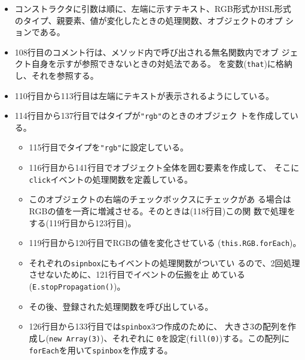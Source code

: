 \begin{itemize}
 \item コンストラクタに引数は順に、左端に示すテキスト、RGB形式かHSL形式
			 のタイプ、親要素、値が変化したときの処理関数、オブジェクトのオプ
			 ションである。
 \item 108行目のコメント行は、メソッド内で呼び出される無名関数内でオブ
			 ジェクト自身を示すが参照できないときの対処法である。
			 を変数(\texttt{that})に格納し、それを参照する。
 \item 110行目から113行目は左端にテキストが表示されるようにしている。
 \item 114行目から137行目ではタイプが\texttt{"rgb"}のときのオブジェク
			 トを作成している。
			 \begin{itemize}
				\item 115行目でタイプを\texttt{"rgb"}に設定している。
				\item 116行目から141行目でオブジェクト全体を囲む要素を作成して、
							そこに\texttt{click}イベントの処理関数を定義している。
				\item このオブジェクトの右端のチェックボックスにチェックがあ
							る場合はRGBの値を一斉に増減させる。そのときは(118行目)この関
							数で処理をする(119行目から123行目)。
				\item 119行目から120行目でRGBの値を変化させている
							(\texttt{this.RGB.forEach})。
				\item それぞれの\texttt{sipnbox}にもイベントの処理関数がついてい
							るので、2回処理させないために、121行目でイベントの伝搬を止
							めている(\texttt{E.stopPropagation()})。
				\item その後、登録された処理関数を呼び出している。
			  \item 126行目から133行目では\texttt{spinbox}3つ作成のために、
							大きさ3の配列を作成し(\texttt{new Array(3)})、それぞれに
							\texttt{0}を設定(\texttt{fill(0)})する。この配列に
							\texttt{forEach}を用いて\texttt{spinbox}を作成する。


\end{itemize}
\end{itemize}

